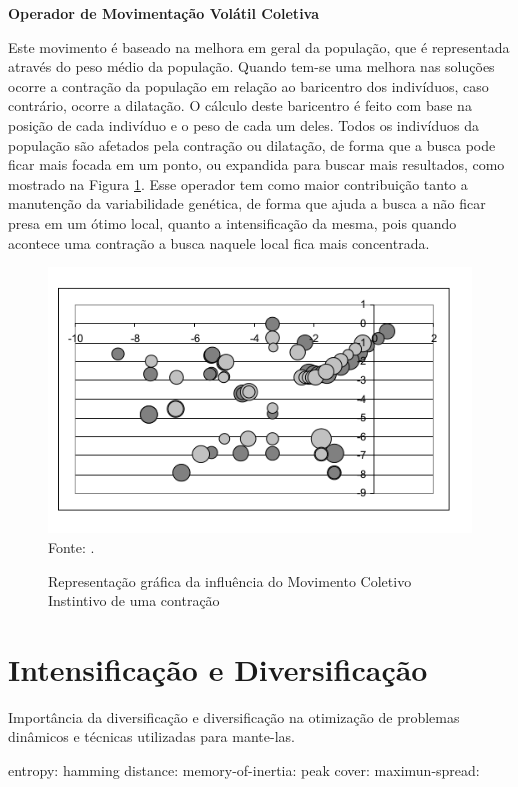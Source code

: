 \noindent \textbf{Operador de Movimentação Volátil Coletiva}

Este movimento é baseado na melhora em geral da população, que é representada através do peso médio da população. Quando tem-se uma melhora nas soluções ocorre a contração da população em relação ao baricentro dos indivíduos, caso contrário, ocorre a dilatação. O cálculo deste baricentro é feito com base na posição de cada indivíduo e o peso de cada um deles. Todos os indivíduos da população são afetados pela contração ou dilatação, de forma que a busca pode ficar mais focada em um ponto, ou expandida para buscar mais resultados, como mostrado na Figura \ref{fig:volitute_moviment}. Esse operador tem como maior contribuição tanto a manutenção da variabilidade genética, de forma que ajuda a busca a não ficar presa em um ótimo local, quanto a intensificação da mesma, pois quando acontece uma contração a busca naquele local fica mais concentrada.

\begin{figure}[!htb]
	\caption{Representação gráfica da influência do Movimento Coletivo Instintivo de uma contração}
	\centering
	\includegraphics[scale=0.5]{images/movimento_volatil.png}
	\label{fig:volitute_moviment}{\\Fonte: .}
\end{figure}

\section{Intensificação e Diversificação}
\label{sec:intesification_diversification}
Importância da diversificação e diversificação na otimização de problemas dinâmicos e técnicas utilizadas para mante-las.

entropy: \cite{mori2001adaptation}
hamming distance: \cite{rand2005measurements}
memory-of-inertia: \cite{morrison2001measurement}
peak cover: \cite{branke2012evolutionary}
maximun-spread: \cite{goh2009competitive}
